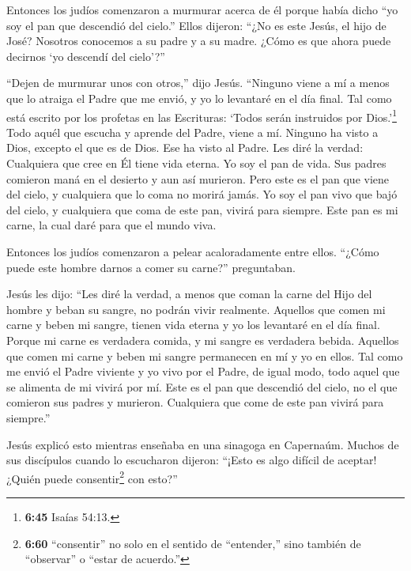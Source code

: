  Entonces los judíos comenzaron a murmurar acerca de él
porque había dicho ``yo soy el pan que descendió del cielo.''
 Ellos dijeron: ``¿No es este Jesús, el hijo de José?
Nosotros conocemos a su padre y a su madre. ¿Cómo es que ahora puede
decirnos `yo descendí del cielo'?''

 ``Dejen de murmurar unos con otros,'' dijo Jesús.
 ``Ninguno viene a mí a menos que lo atraiga el Padre que
me envió, y yo lo levantaré en el día final.  Tal como está
escrito por los profetas en las Escrituras: `Todos serán instruidos por
Dios.'\footnote{\textbf{6:45} Isaías 54:13.} Todo aquél que escucha y
aprende del Padre, viene a mí.  Ninguno ha visto a Dios,
excepto el que es de Dios. Ese ha visto al Padre.  Les diré
la verdad: Cualquiera que cree en Él tiene vida eterna.  Yo
soy el pan de vida.  Sus padres comieron maná en el
desierto y aun así murieron.  Pero este es el pan que viene
del cielo, y cualquiera que lo coma no morirá jamás.  Yo
soy el pan vivo que bajó del cielo, y cualquiera que coma de este pan,
vivirá para siempre. Este pan es mi carne, la cual daré para que el
mundo viva.

 Entonces los judíos comenzaron a pelear acaloradamente
entre ellos. ``¿Cómo puede este hombre darnos a comer su carne?''
preguntaban.

 Jesús les dijo: ``Les diré la verdad, a menos que coman la
carne del Hijo del hombre y beban su sangre, no podrán vivir realmente.
 Aquellos que comen mi carne y beben mi sangre, tienen vida
eterna y yo los levantaré en el día final.  Porque mi carne
es verdadera comida, y mi sangre es verdadera bebida. 
Aquellos que comen mi carne y beben mi sangre permanecen en mí y yo en
ellos.  Tal como me envió el Padre viviente y yo vivo por
el Padre, de igual modo, todo aquel que se alimenta de mi vivirá por mí.
 Este es el pan que descendió del cielo, no el que comieron
sus padres y murieron. Cualquiera que come de este pan vivirá para
siempre.''

 Jesús explicó esto mientras enseñaba en una sinagoga en
Capernaúm.  Muchos de sus discípulos cuando lo escucharon
dijeron: ``¡Esto es algo difícil de aceptar! ¿Quién puede
consentir\footnote{\textbf{6:60} ``consentir'' no solo en el sentido de
  ``entender,'' sino también de ``observar'' o ``estar de acuerdo.''}
con esto?''

